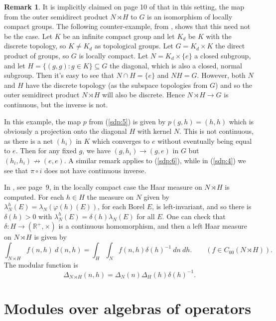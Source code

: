 \documentclass[twoside,a4paper,12pt]{article}
\theoremstyle{plain}
\theoremstyle{definition}
\newtheorem{remark}[proposition]{Remark}
\begin{document}
\begin{remark}
It is implicitly claimed on page 10 of \cite{kt} that in this setting, the map from the outer
semidirect product $N \rtimes H$ to $G$ is an isomorphism of locally compact groups.  The following
counter-example, from \cite{a3}, shows that this need not be the case.  Let $K$ be an infinite compact
group and let $K_d$ be $K$ with the discrete topology, so $K\not=K_d$ as topological groups.  Let
$G = K_d \times K$ the direct product of groups, so $G$ is locally compact.  Let $N = K_d \times \{e\}$
a closed subgroup, and let $H = \{ (g,g) : g\in K \} \subseteq G$ the diagonal, which is also a closed,
normal subgroup.  Then it's easy to see that $N\cap H=\{e\}$ and $NH = G$.  However, both $N$ and $H$ have
the discrete topology (as the subspace topologies from $G$) and so the outer semidirect product
$N \rtimes H$ will also be discrete.  Hence $N\rtimes H\rightarrow G$ is continuous, but the inverse is
not.

In this example, the map $p$ from (\ref{sdp:5}) is given by $p(g,h) = (h,h)$ which is obviously a
projection onto the diagonal $H$ with kernel $N$.  This is not continuous, as there is a net $(h_i)$ in
$K$ which converges to $e$ without eventually being equal to $e$.  Then for any fixed $g$, we have
$(g,h_i) \rightarrow (g,e)$ in $G$ but $(h_i,h_i) \not\rightarrow (e,e)$.  A similar remark applies
to (\ref{sdp:6}), while in (\ref{sdp:4}) we see that $\pi\circ i$ does not have continuous inverse.
\end{remark}

In \cite{kt}, see page~9, in the locally compact case the Haar measure on $N \rtimes H$ is computed.
For each $h\in H$ the measure on $N$ given by $\lambda_N^h(E) = \lambda_N(\varphi(h)(E))$, for each Borel $E$,
is left-invariant, and so there is $\delta(h)>0$ with $\lambda_N^h(E) = \delta(h) \lambda_N(E)$ for
all $E$.  One can check that $\delta:H\rightarrow (\mathbb R^+, \times)$ is a continuous homomorphism,
and then a left Haar measure on $N \rtimes H$ is given by
\[ \int_{N \rtimes H} f(n,h) \ d(n,h) = \int_H \int_N f(n,h) \delta(h)^{-1} \ dn \ dh. 
\qquad (f\in C_{00}(N \rtimes H)). \]
The modular function is
\[ \Delta_{N \rtimes H}(n,h) = \Delta_N(n) \Delta_H(h) \delta(h)^{-1}. \]





\clearpage

\section{Modules over algebras of operators}
\end{document}
